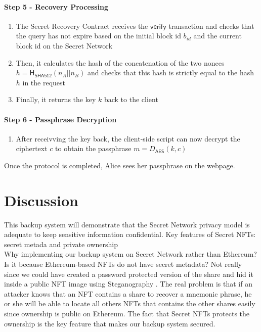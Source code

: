 \documentclass[12pt]{article}
\newcommand{\ms}[1]{\ensuremath{\mathsf{#1}}}
\begin{document}
\paragraph{Step 5 - Recovery Processing}

\begin{enumerate}[label=5.\arabic*]
    \item The Secret Recovery Contract receives the $\ms{verify}$ transaction and checks that the query has not expire based on the initial block id $b_{id}$ and the current block id on the Secret Network
  \item Then, it calculates the hash of the concatenation of the two nonces $h=\ms{H_{\ms{SHA512}}}(n_A || n_B)$ and checks that this hash is strictly equal to the hash $h$ in the request
  \item Finally, it returns the key $k$ back to the client
\end{enumerate}

\paragraph{Step 6 - Passphrase Decryption}

\begin{enumerate}[label=6.\arabic*]
  \item After receivving the key back, the client-side script can now decrypt the ciphertext $c$ to obtain the passphrase $m=D_{\ms{AES}}(k, c)$
\end{enumerate}

Once the protocol is completed, Alice sees her passphrase on the webpage.

\section{Discussion}

This backup system will demonstrate that the Secret Network privacy model is adequate to keep sensitive information confidential. Key features of Secret NFTs: secret metada and private ownership \\ 

Why implementing our backup system on Secret Network rather than Ethereum? Is it because Ethereum-based NFTs do not have secret metadata? Not really since we could have created a password protected version of the share and hid it inside a public NFT image using Steganography \cite{Steganography}. The real problem is that if an attacker knows that an NFT contains a share to recover a mnemonic phrase, he or she will be able to locate all others NFTs that contains the other shares easily since ownership is public on Ethereum. The fact that Secret NFTs protects the ownership is the key feature that makes our backup system secured. 
\end{document}
